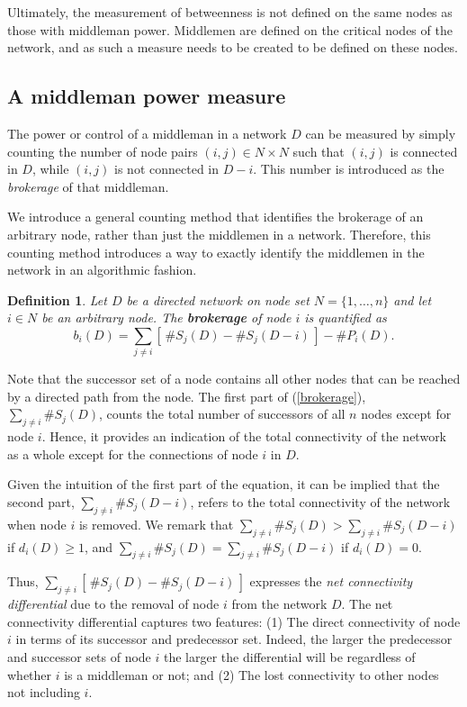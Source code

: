 \documentclass[11pt,fleqn]{article}
\newtheorem{definition}[theorem]{Definition}
\begin{document}
Ultimately, the measurement of betweenness is not defined on the same nodes as those with middleman power. Middlemen are defined on the critical nodes of the network, and as such a measure needs to be created to be defined on these nodes.

\subsection{A middleman power measure}

The power or control of a middleman in a network $D$ can be measured by simply counting the number of node pairs $(i,j) \in N \times N$ such that $(i,j)$ is connected in $D$, while $(i,j)$ is not connected in $D-i$. This number is introduced as the \emph{brokerage} of that middleman.

We introduce a general counting method that identifies the brokerage of an arbitrary node, rather than just the middlemen in a network. Therefore, this counting method introduces a way to exactly identify the middlemen in the network in an algorithmic fashion.

\begin{definition}
	Let $D$ be a directed network on node set $N = \{1, \ldots ,n\}$ and let $i \in N$ be an arbitrary node. The \textbf{brokerage} of node $i$ is quantified as
	\begin{equation} \label{brokerage}
		b_{i}(D) = \sum_{j \neq i} \left[ \, \# S_{j}(D) - \# S_{j}(D - i) \, \right] - \#P_{i}(D) .
	\end{equation}
\end{definition}

\noindent
Note that the successor set of a node contains all other nodes that can be reached by a directed path from the node. The first part of (\ref{brokerage}), $\sum_{j \neq i} \# S_{j}(D)$, counts the total number of successors of all $n$ nodes except for node $i$. Hence, it provides an indication of the total connectivity of the network as a whole except for the connections of node $i$ in $D$.

Given the intuition of the first part of the equation, it can be implied that the second part, $\sum_{j \neq i} \# S_{j}(D - i)$, refers to the total connectivity of the network when node $i$ is removed. We remark that $\sum_{j \neq i} \# S_{j}(D) > \sum_{j \neq i} \# S_{j}(D - i)$ if $d_{i}(D) \geqslant 1$, and $\sum_{j \neq i} \# S_{j}(D) = \sum_{j \neq i} \# S_{j}(D - i)$ if $d_{i} (D) = 0$.

Thus, $\sum_{j \neq i} \left[ \, \# S_{j}(D) - \# S_{j}(D - i) \, \right]$ expresses the \emph{net connectivity differential} due to the removal of node $i$ from the network $D$. The net connectivity differential captures two features: (1) The direct connectivity of node $i$ in terms of its successor and predecessor set. Indeed, the larger the predecessor and successor sets of node $i$ the larger the differential will be regardless of whether $i$ is a middleman or not; and (2) The lost connectivity to other nodes not including $i$.
\end{document}

